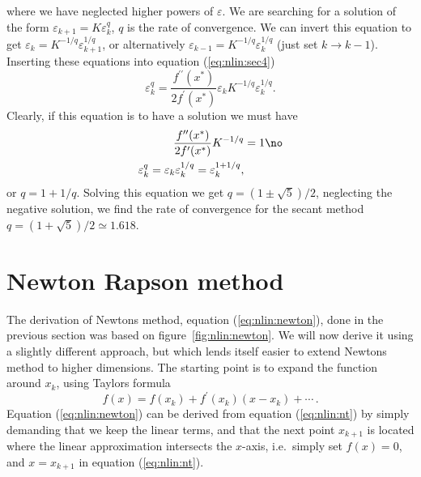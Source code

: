 \documentclass[graybox,sectrefs,envcountresetchap,open=right,final]{svmonodo}
\begin{document}
where we have neglected higher powers of $\varepsilon$. We are searching for a solution of the form $\varepsilon_{k+1}=K\varepsilon_k^q$, $q$ is the rate of convergence. We can invert this equation to get $\varepsilon_k=K^{-1/q}\varepsilon_{k+1}^{1/q}$, or alternatively $\varepsilon_{k-1}=K^{-1/q}\varepsilon_{k}^{1/q}$ (just set $k\to k-1$). Inserting these equations into equation (\ref{eq:nlin:sec4})
\begin{equation}
\varepsilon_k^q=\frac{f^{\prime\prime}(x^*)}{2f^\prime(x^*)}\varepsilon_kK^{-1/q}\varepsilon_{k}^{1/q}.
\label{eq:nlin:sec5}
\end{equation}
Clearly, if this equation is to have a solution we must have
\begin{align}
\frac{f^{\prime\prime}(x^*)}{2f^\prime(x^*)}K^{-1/q} &=1\no\\ 
\varepsilon_k^q=\varepsilon_k\varepsilon_{k}^{1/q}=\varepsilon_{k}^{1+1/q},
\end{align}
or $q=1+1/q$. Solving this equation we get $q=(1\pm\sqrt{5})/2$, neglecting the negative solution, we find the rate of convergence for the secant method $q=(1+\sqrt{5})/2\simeq 1.618$.

\section{Newton Rapson method}
The derivation of Newtons method, equation (\ref{eq:nlin:newton}), done in the previous section was based on figure~\ref{fig:nlin:newton}. We will now derive it using a slightly different approach, but which lends itself easier to extend Newtons method to higher dimensions. The starting point is to expand the function around $x_k$, using Taylors formula
\begin{equation}
f(x)=f(x_k)+f^\prime(x_k)(x-x_k) + \cdots\,.
\label{eq:nlin:nt}
\end{equation}
Equation (\ref{eq:nlin:newton}) can be derived from equation (\ref{eq:nlin:nt}) by simply demanding that we keep the linear terms, and that the next point $x_{k+1}$ is located where the linear approximation intersects the $x$-axis, i.e.~simply set $f(x)=0$, and $x=x_{k+1}$ in equation (\ref{eq:nlin:nt}).
\end{document}

